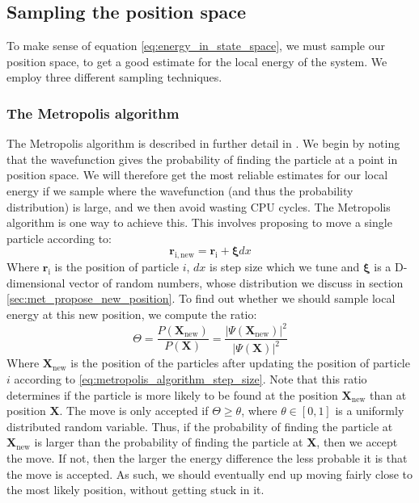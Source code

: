 \documentclass[a4paper, 10pt]{article}
\begin{document}
	\subsection{Sampling the position space}
	To make sense of equation \ref{eq:energy_in_state_space}, we must sample our position space, to get a good estimate for the local energy of the system. We employ three different sampling techniques.	
	\subsubsection{The Metropolis algorithm}
	The Metropolis algorithm is described in further detail in \cite{Hjorth-Jensen2015}. We begin by noting that the wavefunction gives the probability of finding the particle at a point in position space. We will therefore get the most reliable estimates for our local energy if we sample where the wavefunction (and thus the probability distribution) is large, and we then avoid wasting CPU cycles. The Metropolis algorithm is one way to achieve this. This involves proposing to move a single particle according to:
	\begin{equation}\label{eq:metropolis_algorithm_step_size}
	\boldsymbol{r}_{\mathrm{i,new}}=\boldsymbol{r}_{\mathrm{i}}+\boldsymbol{\xi}dx
	\end{equation}
	Where $\boldsymbol{r}_{\mathrm{i}}$ is the position of particle $i$, $dx$ is step size which we tune and $\boldsymbol{\xi}$ is a D-dimensional vector of random numbers, whose distribution we discuss in section \ref{sec:met_propose_new_position}. To find out whether we should sample local energy at this new position, we compute the ratio:
	\begin{equation}\label{eq:transition_probability}
	\Theta=\frac{P(\boldsymbol{X}_{\mathrm{new}})}{P(\boldsymbol{X})}=\frac{|\Psi(\boldsymbol{X}_{\mathrm{new}})|^2}{|\Psi(\boldsymbol{X})|^2}
	\end{equation}
	Where $\boldsymbol{X}_{\mathrm{new}}$ is the position of the particles after updating the position of particle $i$ according to \ref{eq:metropolis_algorithm_step_size}. Note that this ratio determines if the particle is more likely to be found at the position $\boldsymbol{X}_{\mathrm{new}}$ than at position $\boldsymbol{X}$. The move is only accepted if $\Theta \geq \theta$, where $\theta\in[0,1]$ is a uniformly distributed random variable. Thus, if the probability of finding the particle at $\mathbf{X}_{\mathrm{new}}$ is larger than the probability of finding the particle at $\mathbf{X}$, then we accept the move. If not, then the larger the energy difference the less probable it is that the move is accepted. As such, we should eventually end up moving fairly close to the most likely position, without getting stuck in it.
\end{document}
